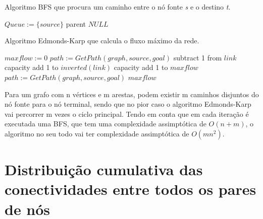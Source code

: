 \documentclass[12pt,a4paper]{article}
\begin{document}
\begin{algorithm}
\caption{Algoritmo BFS que procura um caminho entre o nó fonte \textit{s} e o destino \textit{t}.}\label{alg:bfs_goal}
\begin{algorithmic}[1]
    \EndFor
    \State $Queue :=  \{source\}$
      		\Return parent 
      \EndIf
            \EndIf
      \EndFor
  	\EndWhile
  	\Return $NULL$
\EndProcedure
\end{algorithmic}
\end{algorithm}

\begin{algorithm}
\caption{Algoritmo Edmonds-Karp que calcula o fluxo máximo da rede.}\label{alg:residual_network}
\begin{algorithmic}[1]
    \State $maxflow := 0 $
    \State $path := GetPath(graph,source,goal)$
      		\State subtract 1 from $link$ capacity
        	\State add 1 to $inverted(link)$ capacity
      \EndFor
      \State add 1 to $maxflow$
      \State $path := GetPath(graph,source,goal)$
  	\EndWhile
  	\Return $maxflow$
\EndProcedure
\end{algorithmic}
\end{algorithm}

Para um grafo com n vértices e m arestas, podem existir m caminhos disjuntos do nó fonte para o nó terminal, sendo que no pior caso o algoritmo Edmonds-Karp vai percorrer m vezes o ciclo principal.
Tendo em conta que em cada iteração é executada uma BFS, que tem uma complexidade assimptótica de $O(n+m)$, o algoritmo no seu todo vai ter complexidade assimptótica de $O(m n^2)$.

\section{Distribuição cumulativa das conectividades entre todos os pares de nós}
\end{document}
